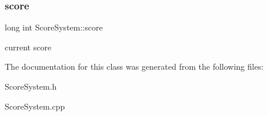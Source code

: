 \subsubsection{\texorpdfstring{score}{score}}
{\footnotesize\ttfamily long int Score\+System\+::score\hspace{0.3cm}{\ttfamily [private]}}

current score 

The documentation for this class was generated from the following files\+:\begin{DoxyCompactItemize}
\item 
Score\+System.\+h\item 
Score\+System.\+cpp\end{DoxyCompactItemize}
